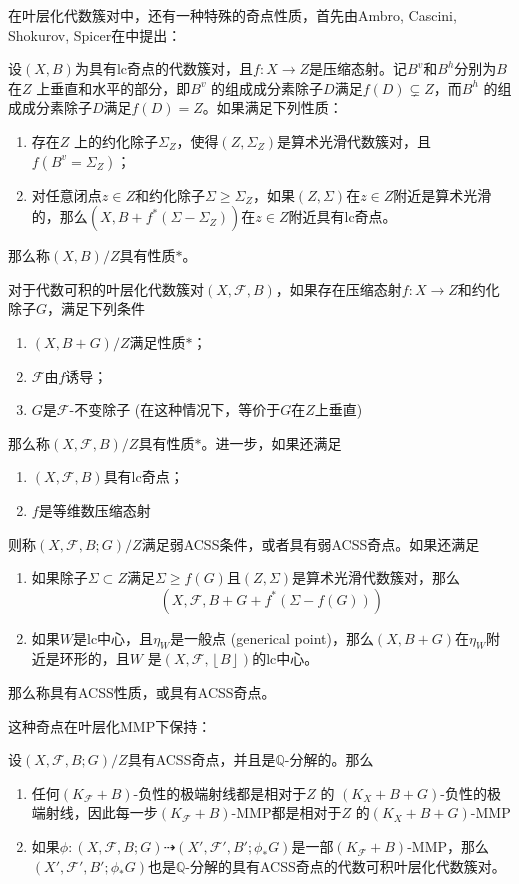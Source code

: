 在叶层化代数簇对中，还有一种特殊的奇点性质，首先由Ambro, Cascini, Shokurov, Spicer在\cite{acss}中提出：
\begin{definition}[ACSS奇点]\cite[Definition 4.1-3]{acc_foliation}
 设$ (X,B) $为具有lc奇点的代数簇对，且$f: X\to Z$是压缩态射。记$B^{v}$和$ B^{h}$分别为$B$ 在$Z$ 上垂直和水平的部分，即$B^{v}$ 的组成成分素除子$D$满足$f(D)\subsetneq Z $，而$B^{h}$  的组成成分素除子$D$满足$f(D)= Z$。如果满足下列性质：
 \begin{enumerate}
   \item 存在$Z$ 上的约化除子$\Sigma_{Z}$，使得$(Z,\Sigma_{Z}) $是算术光滑代数簇对，且$f(B^{v}=\Sigma_{Z})$；
   \item 对任意闭点$z \in Z$和约化除子$\Sigma \geqslant \Sigma_{Z}$，如果$(Z,\Sigma)$在$z \in Z$附近是算术光滑的，那么$(X,B+f^{*}(\Sigma-\Sigma_{Z}))$在$z \in Z$附近具有lc奇点。 
 \end{enumerate}
 那么称$(X,B)/Z$具有性质$*$。

 对于代数可积的叶层化代数簇对$(X,\mathcal{F},B)$，如果存在压缩态射$f:X \to Z$和约化除子$G$，满足下列条件
 \begin{enumerate}
   \item $(X,B+G)/Z$满足性质$*$；
   \item $\mathcal{F}$由$ f$诱导；
   \item $G$是$\mathcal{F}$-不变除子 (在这种情况下，等价于$G$在$Z$上垂直)
 \end{enumerate}
那么称$(X,\mathcal{F},B)/Z$具有性质$*$。进一步，如果还满足
\begin{enumerate}
  \item $(X,\mathcal{F},B)$具有lc奇点；
  \item $f$是等维数压缩态射
\end{enumerate}
则称$(X,\mathcal{F},B;G)/Z$满足弱ACSS条件，或者具有弱ACSS奇点。如果还满足
\begin{enumerate}
  \item 如果除子$\Sigma \subset Z$满足$\Sigma \geqslant f(G)$且$(Z,\Sigma)$是算术光滑代数簇对，那么
    \[ (X,\mathcal{F},B+G+f^{*}(\Sigma - f(G ))) \]
  \item 如果$W$是lc中心，且$ \eta_{W}$是一般点 (generical point)，那么$(X,B+G)$在$\eta_{W}$附近是环形的，且$W$ 是$(X,\mathcal{F},\left\lfloor B \right\rfloor )$的lc中心。
\end{enumerate}
那么称具有ACSS性质，或具有ACSS奇点。
\end{definition}
这种奇点在叶层化MMP下保持：
\begin{proposition}\cite[Lemma 4.8]{acc_foliation}
 设$(X,\mathcal{F},B;G)/Z$具有ACSS奇点，并且是$\mathbb{Q}$-分解的。那么 
 \begin{enumerate}
   \item 任何$(K_{\mathcal{F}}+B)$-负性的极端射线都是相对于$Z$ 的 $(K_{X}+B+G)$-负性的极端射线，因此每一步$(K_{\mathcal{F}}+B)$-MMP都是相对于$Z$ 的$(K_{X}+B+G)$-MMP 
   \item 如果$\phi:(X,\mathcal{F},B;G) \dashrightarrow (X',\mathcal{F}',B';\phi_{*}G)$是一部$(K_{\mathcal{F}}+B)$-MMP，那么$(X',\mathcal{F}',B';\phi_{*}G)$也是$\mathbb{Q}$-分解的具有ACSS奇点的代数可积叶层化代数簇对。
 \end{enumerate}
\end{proposition}


